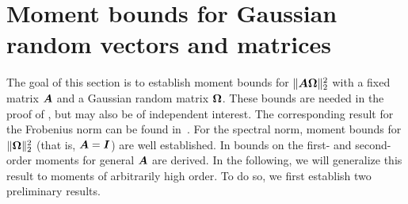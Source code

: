 \appendix

\section{Moment bounds for Gaussian random vectors and matrices}

The goal of this section is to establish moment bounds for $\lVert \boldsymbol{A} \boldsymbol{\Omega} \rVert _2^2$ with a fixed matrix $\boldsymbol{A}$ and a Gaussian random matrix $\boldsymbol{\Omega}$. These bounds are needed in the proof of , but may also be of independent interest.
The corresponding result for the Frobenius norm can be found in~\cite[Lemma 3]{kressner-2024-randomized-lowrank}. For the spectral norm, moment bounds for $\lVert \boldsymbol{\Omega} \rVert _2^2$ (that is, $\boldsymbol{A} = \boldsymbol{I}$) are well established\cite{chen-2005-condition-numbers, edelman-1988-eigenvalues-condition, james-1964-distributions-matrix}. In \cite[Lemma B.1]{tropp-2023-randomized-algorithms} bounds on the first- and second-order moments for general $\boldsymbol{A}$ are derived. In the following, we will generalize this result to moments of arbitrarily high order. To do so, we first establish two preliminary results.

